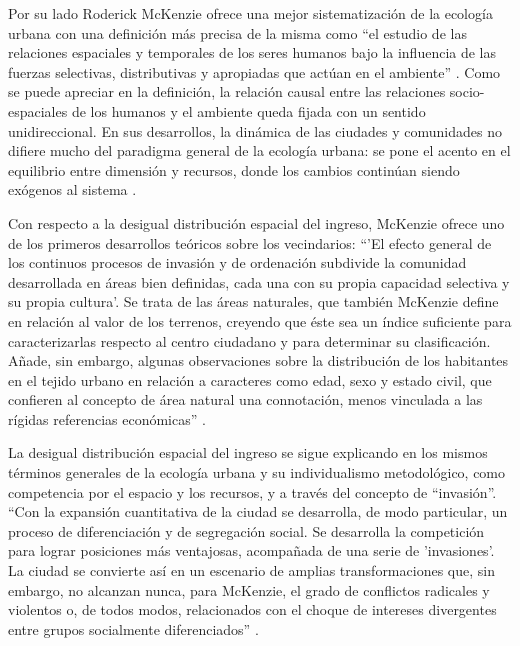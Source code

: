Por su lado Roderick McKenzie \citeyear{mckenzie} ofrece una mejor sistematización de la ecología urbana con una definición más precisa de la misma como “el estudio de las relaciones espaciales y temporales de los seres humanos bajo la influencia de las fuerzas selectivas, distributivas y apropiadas que actúan en el ambiente” \cite[p.~91]{betin}. Como se puede apreciar en la definición, la relación causal entre las relaciones socio-espaciales de los humanos y el ambiente queda fijada con un sentido unidireccional. En sus desarrollos, la dinámica de las ciudades y comunidades no difiere mucho del paradigma general de la ecología urbana: se pone el acento en el equilibrio entre dimensión y recursos, donde los cambios continúan siendo exógenos al sistema \cite{gottdiener}. 

Con respecto a la desigual distribución espacial del ingreso, McKenzie ofrece uno de los primeros desarrollos teóricos sobre los vecindarios: “'El efecto general de los continuos procesos de invasión y de ordenación subdivide la comunidad desarrollada en áreas bien definidas, cada una con su propia capacidad selectiva y su propia cultura'. Se trata de las áreas naturales, que también McKenzie define en relación al valor de los terrenos, creyendo que éste sea un índice suficiente para caracterizarlas respecto al centro ciudadano y para determinar su clasificación. Añade, sin embargo, algunas observaciones sobre la distribución de los habitantes en el tejido urbano en relación a caracteres como edad, sexo y estado civil, que confieren al concepto de área natural una connotación, menos vinculada a las rígidas referencias económicas” \cite[p.~92]{betin}.

La desigual distribución espacial del ingreso se sigue explicando en los mismos términos generales de la ecología urbana y su individualismo metodológico, como competencia por el espacio y los recursos, y a través del concepto de “invasión”. “Con la expansión cuantitativa de la ciudad se desarrolla, de modo particular, un proceso de diferenciación y de segregación social. Se desarrolla la competición para lograr posiciones más ventajosas, acompañada de una serie de 'invasiones'. La ciudad se convierte así en un escenario de amplias transformaciones que, sin embargo, no alcanzan nunca, para McKenzie, el grado de conflictos radicales y violentos o, de todos modos, relacionados con el choque de intereses divergentes entre grupos socialmente diferenciados” \cite[p.~93]{betin}.

